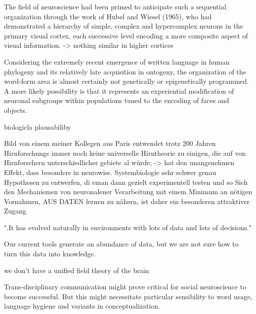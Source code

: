 \documentclass[authoryear,review,3p]{elsarticle}
\begin{document}
The field of neuroscience had been primed to anticipate such a sequential organization through the work of Hubel and Wiesel (1965), who had demonstrated a hierarchy of simple, complex and hypercomplex neurons in the primary visual cortex, each successive level encoding a more composite aspect of visual information.
-> nothing similar in higher cortices

Considering the extremely recent emergence of written language in human phylogeny and its relatively late acquisition in ontogeny, the organization of the word-form area is almost certainly not genetically or epigenetically programmed. A more likely possibility is that it represents an experiential modification of neuronal subgroups within populations tuned to the encoding of faces and objects. 




biologicla plausabiliby

Bild von einem meiner Kollegen aus Paris entwendet
trotz 200 Jahren Hirnforschungs immer noch keine universelle Hirntheorie zu einigen, die auf von Hirnforschern unterschiedlicher gebiete al würde;
-> hat den unangenehmen Effekt, dass besonders in neurowiss. Systembiologie sehr schwer genau Hypothesen zu entwerfen, di eman dann gezielt experimentell testen und so
Sich den Mechanismen von neuronalener Verarbeitung mit einem Minimum an nötigen Vornahmen, AUS DATEN lernen zu nähern, ist daher ein besonderen attraktiver Zugang

".It has evolved naturally in environments with lots of data and lots of decisions."

Our current tools generate an abundance of data, but we are not sure how to turn this data into knowledge.

we don’t have a unified field theory of the brain







Trans-disciplinary communication might prove critical for social neuroscience to become successful. But this might necessitate particular sensibility to word usage, language hygiene and variants in conceptualization.
\end{document}
